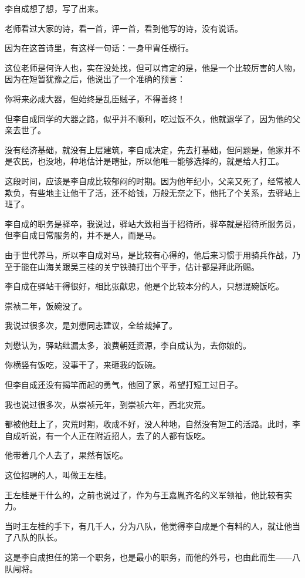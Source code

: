 \begin{multicols}{\theparacolNo}
李自成想了想，写了出来。

老师看过大家的诗，看一首，评一首，看到他写的诗，没有说话。

因为在这首诗里，有这样一句话：一身甲胄任横行。

这位老师是何许人也，实在没处找，但可以肯定的是，他是一个比较厉害的人物，因为在短暂犹豫之后，他说出了一个准确的预言：

你将来必成大器，但始终是乱臣贼子，不得善终！

但李自成同学的大器之路，似乎并不顺利，吃过饭不久，他就退学了，因为他的父亲去世了。

没有经济基础，就没有上层建筑，李自成决定，先去打基础，但问题是，他家并不是农民，也没地，种地估计是瞎扯，所以他唯一能够选择的，就是给人打工。

这段时间，应该是李自成比较郁闷的时期。因为他年纪小，父亲又死了，经常被人欺负，有些地主让他干了活，还不给钱，万般无奈之下，他托了个关系，去驿站上班了。

李自成的职务是驿卒，我说过，驿站大致相当于招待所，驿卒就是招待所服务员，但李自成日常服务的，并不是人，而是马。

由于世代养马，所以李自成对马，是比较有心得的，他后来习惯于用骑兵作战，乃至于能在山海关跟吴三桂的关宁铁骑打出个平手，估计都是拜此所赐。

李自成在驿站干得很好，相比张献忠，他是个比较本分的人，只想混碗饭吃。

崇祯二年，饭碗没了。

我说过很多次，是刘懋同志建议，全给裁掉了。

刘懋认为，驿站纰漏太多，浪费朝廷资源，李自成认为，去你娘的。

你横竖有饭吃，没事干了，来砸我的饭碗。

但李自成还没有揭竿而起的勇气，他回了家，希望打短工过日子。

我也说过很多次，从崇祯元年，到崇祯六年，西北灾荒。

都被他赶上了，灾荒时期，收成不好，没人种地，自然没有短工的活路。此时，李自成听说，有一个人正在附近招人，去了的人都有饭吃。

他带着几个人去了，果然有饭吃。

这位招聘的人，叫做王左桂。

王左桂是干什么的，之前也说过了，作为与王嘉胤齐名的义军领袖，他比较有实力。

当时王左桂的手下，有几千人，分为八队，他觉得李自成是个有料的人，就让他当了八队的队长。

这是李自成担任的第一个职务，也是最小的职务，而他的外号，也由此而生——八队闯将。


\end{multicols}
